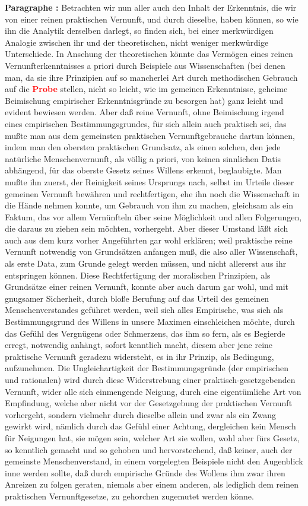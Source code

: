 \documentclass[a4paper,12pt,twoside]{book}
\newcommand{\match}[1]{\textcolor{red}{\textbf{#1}}}
\begin{document}
	\textbf{Paragraphe : }Betrachten wir nun aller auch den Inhalt der Erkenntnis, die wir von einer reinen praktischen Vernunft, und durch dieselbe, haben können, so wie ihn die Analytik derselben darlegt, so finden sich, bei einer merkwürdigen Analogie zwischen ihr und der theoretischen, nicht weniger merkwürdige Unterschiede. In Ansehung der theoretischen könnte das Vermögen eines reinen Vernunfterkenntnisses a priori durch Beispiele aus Wissenschaften (bei denen man, da sie ihre Prinzipien auf so mancherlei Art durch methodischen Gebrauch auf die \match{Probe} stellen, nicht so leicht, wie im gemeinen Erkenntnisse, geheime Beimischung empirischer Erkenntnisgründe zu besorgen hat) ganz leicht und evident bewiesen werden. Aber daß reine Vernunft, ohne Beimischung irgend eines empirischen Bestimmungsgrundes, für sich allein auch praktisch sei, das mußte man aus dem gemeinsten praktischen Vernunftgebrauche dartun können, indem man den obersten praktischen Grundsatz, als einen solchen, den jede natürliche Menschenvernunft, als völlig a priori, von keinen sinnlichen Datis abhängend, für das oberste Gesetz seines Willens erkennt, beglaubigte. Man mußte ihn zuerst, der Reinigkeit seines Ursprungs nach, selbst im Urteile dieser gemeinen Vernunft bewähren und rechtfertigen, ehe ihn noch die Wissenschaft in die Hände nehmen konnte, um Gebrauch von ihm zu machen, gleichsam als ein Faktum, das vor allem Vernünfteln über seine Möglichkeit und allen Folgerungen, die daraus zu ziehen sein möchten, vorhergeht. Aber dieser Umstand läßt sich auch aus dem kurz vorher Angeführten gar wohl erklären; weil praktische reine Vernunft notwendig von Grundsätzen anfangen muß, die also aller Wissenschaft, als erste Data, zum Grunde gelegt werden müssen, und nicht allererst aus ihr entspringen können. Diese Rechtfertigung der moralischen Prinzipien, als Grundsätze einer  reinen Vernunft, konnte aber auch darum gar wohl, und mit gnugsamer Sicherheit, durch bloße Berufung auf das Urteil des gemeinen Menschenverstandes geführet werden, weil sich alles Empirische, was sich als Bestimmungsgrund des Willens in unsere Maximen einschleichen möchte, durch das Gefühl des Vergnügens oder Schmerzens, das ihm so fern, als es Begierde erregt, notwendig anhängt, sofort kenntlich macht, diesem aber jene reine praktische Vernunft geradezu widersteht, es in ihr Prinzip, als Bedingung, aufzunehmen. Die Ungleichartigkeit der Bestimmungsgründe (der empirischen und rationalen) wird durch diese Widerstrebung einer praktisch-gesetzgebenden Vernunft, wider alle sich einmengende Neigung, durch eine eigentümliche Art von Empfindung, welche aber nicht vor der Gesetzgebung der praktischen Vernunft vorhergeht, sondern vielmehr durch dieselbe allein und zwar als ein Zwang gewirkt wird, nämlich durch das Gefühl einer Achtung, dergleichen kein Mensch für Neigungen hat, sie mögen sein, welcher Art sie wollen, wohl aber fürs Gesetz, so kenntlich gemacht und so gehoben und hervorstechend, daß keiner, auch der gemeinste Menschenverstand, in einem vorgelegten Beispiele nicht den Augenblick inne werden sollte, daß durch empirische Gründe des Wollens ihm zwar ihren Anreizen zu folgen geraten, niemals aber einem anderen, als lediglich dem reinen praktischen Vernunftgesetze, zu gehorchen zugemutet werden könne. 
	
\end{document}
